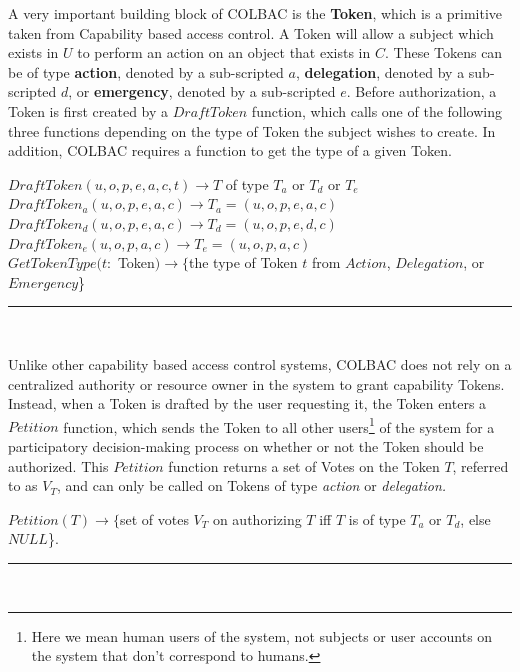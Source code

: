 \noindent A very important building block of COLBAC is the \textbf{Token}, which
is a primitive taken from Capability based access control. A Token will allow a
subject which exists in $U$ to perform an action on an object that exists in
$C$. These Tokens can be of type \textbf{action}, denoted by a sub-scripted $a$,
\textbf{delegation}, denoted by a sub-scripted $d$, or \textbf{emergency},
denoted by a sub-scripted $e$. Before authorization, a Token is first created by
a $DraftToken$ function, which calls one of the following three functions
depending on the type of Token the subject wishes to create. In addition, COLBAC
requires a function to get the type of a given Token.
\begin{definition}\label{def:Tokens}
$DraftToken(u,o,p,e,a,c,t) \rightarrow T$ of type $T_{a}$ or $T_{d}$ or 
$T_{e}$\\
$DraftToken_{a}(u,o,p,e,a,c) \rightarrow T_{a} = (u,o,p,e,a,c)$\\
$DraftToken_{d}(u,o,p,e,a,c) \rightarrow T_{d} = (u,o,p,e,d,c)$\\
$DraftToken_{e}(u,o,p,a,c) \rightarrow T_{e} = (u,o,p,a,c)$\\
$GetTokenType(t:$ Token$) \rightarrow \{$the type of Token $t$ from $Action$,
$Delegation$, or $Emergency$\}
\hrule \mbox{}\\
\end{definition}

\noindent Unlike other capability based access control systems, COLBAC does not
rely on a centralized authority or resource owner in the system to grant
capability Tokens. Instead, when a Token is drafted by the user requesting it,
the Token enters a $Petition$ function, which sends the Token to all other
users\footnote{Here we mean human users of the system, not subjects or user
accounts on the system that don't correspond to humans.} of the system for a
participatory decision-making process on whether or not the Token should be
authorized. This $Petition$ function returns a set of Votes on the Token $T$,
referred to as $V_{T}$, and can only be called on Tokens of type \textit{action}
or \textit{delegation.}

\begin{definition}\label{def:petition}
$Petition(T) \rightarrow \{$set of votes $V_{T}$ on authorizing $T$ iff $T$ is
of type $T_{a}$ or $T_{d}$, else $NULL$\}.\\
\hrule \mbox{}\\
\end{definition}

